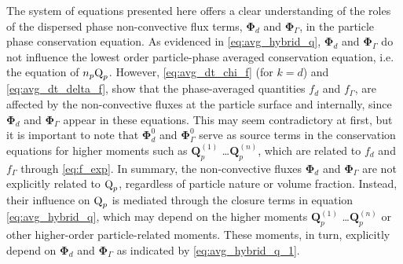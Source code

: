 The system of equations presented here offers a clear understanding of the roles of the dispersed phase non-convective flux terms, $\bm\Phi_d$ and $\bm\Phi_\Gamma$, in the particle phase conservation equation. 
As evidenced in \ref{eq:avg_hybrid_q}, $\bm{\Phi}_d$ and $\bm{\Phi}_\Gamma$  do not influence the lowest order particle-phase averaged conservation equation, i.e. the equation of $n_p \text Q_p$. 
However, \ref{eq:avg_dt_chi_f} (for $k = d$) and \ref{eq:avg_dt_delta_f}, show that the phase-averaged quantities $f_d$ and $f_\Gamma$, are affected by the non-convective fluxes at the particle surface and internally, since $\bm{\Phi}_d$ and $\bm{\Phi}_\Gamma$ appear in these equations.
This may seem contradictory at first, but it is important to note that $\bm{\Phi}_d^0$ and $\bm{\Phi}_\Gamma^0$ serve as source terms in the conservation equations for higher moments such as $\textbf{Q}^{(1)}_p$ \ldots $\textbf{Q}^{(n)}_p$, which are related to $f_d$ and $f_\Gamma$ through \ref{eq:f_exp}.
In summary, the non-convective fluxes $\bm{\Phi}_d$ and $\bm{\Phi}_\Gamma$  are not explicitly related to $\text Q_p$, regardless of particle nature or volume fraction. 
Instead, their influence on $\text Q_p$ is mediated through the closure terms in equation \ref{eq:avg_hybrid_q}, which may depend on the higher moments $\textbf{Q}^{(1)}_p$ \ldots $\textbf{Q}^{(n)}_p$ or other higher-order particle-related moments.%
These moments, in turn, explicitly depend on $\bm{\Phi}_d$ and $\bm{\Phi}_\Gamma$ as indicated by \ref{eq:avg_hybrid_q_1}. 





